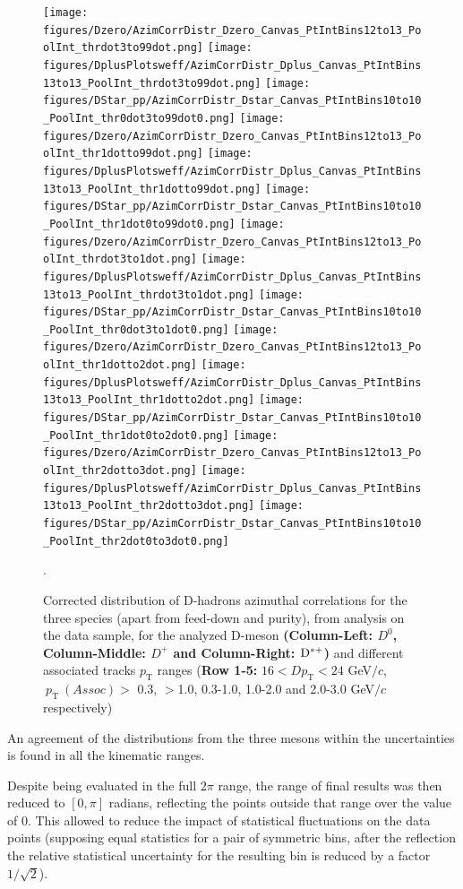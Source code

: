 \begin{figure}[hp]
\centering
{\texttt{[image: figures/Dzero/AzimCorrDistr\_Dzero\_Canvas\_PtIntBins12to13\_PoolInt\_thrdot3to99dot.png]}}
{\texttt{[image: figures/DplusPlotsweff/AzimCorrDistr\_Dplus\_Canvas\_PtIntBins13to13\_PoolInt\_thrdot3to99dot.png]}}
{\texttt{[image: figures/DStar\_pp/AzimCorrDistr\_Dstar\_Canvas\_PtIntBins10to10\_PoolInt\_thr0dot3to99dot0.png]}}
{\texttt{[image: figures/Dzero/AzimCorrDistr\_Dzero\_Canvas\_PtIntBins12to13\_PoolInt\_thr1dotto99dot.png]}}
{\texttt{[image: figures/DplusPlotsweff/AzimCorrDistr\_Dplus\_Canvas\_PtIntBins13to13\_PoolInt\_thr1dotto99dot.png]}}
{\texttt{[image: figures/DStar\_pp/AzimCorrDistr\_Dstar\_Canvas\_PtIntBins10to10\_PoolInt\_thr1dot0to99dot0.png]}}
{\texttt{[image: figures/Dzero/AzimCorrDistr\_Dzero\_Canvas\_PtIntBins12to13\_PoolInt\_thrdot3to1dot.png]}}
{\texttt{[image: figures/DplusPlotsweff/AzimCorrDistr\_Dplus\_Canvas\_PtIntBins13to13\_PoolInt\_thrdot3to1dot.png]}}
{\texttt{[image: figures/DStar\_pp/AzimCorrDistr\_Dstar\_Canvas\_PtIntBins10to10\_PoolInt\_thr0dot3to1dot0.png]}}
{\texttt{[image: figures/Dzero/AzimCorrDistr\_Dzero\_Canvas\_PtIntBins12to13\_PoolInt\_thr1dotto2dot.png]}}
{\texttt{[image: figures/DplusPlotsweff/AzimCorrDistr\_Dplus\_Canvas\_PtIntBins13to13\_PoolInt\_thr1dotto2dot.png]}}
{\texttt{[image: figures/DStar\_pp/AzimCorrDistr\_Dstar\_Canvas\_PtIntBins10to10\_PoolInt\_thr1dot0to2dot0.png]}}
{\texttt{[image: figures/Dzero/AzimCorrDistr\_Dzero\_Canvas\_PtIntBins12to13\_PoolInt\_thr2dotto3dot.png]}}
{\texttt{[image: figures/DplusPlotsweff/AzimCorrDistr\_Dplus\_Canvas\_PtIntBins13to13\_PoolInt\_thr2dotto3dot.png]}}
{\texttt{[image: figures/DStar\_pp/AzimCorrDistr\_Dstar\_Canvas\_PtIntBins10to10\_PoolInt\_thr2dot0to3dot0.png]}}
\caption{Corrected distribution of D-hadrons azimuthal correlations for the three species (apart from feed-down and purity), from analysis on the data sample, for the analyzed D-meson \textbf{(Column-Left: $D^0$, Column-Middle: $D^+$ and Column-Right: ${\rm D^{*+}}$)} and different associated tracks $p_\text{T}$ ranges (\textbf{Row 1-5:} $16 < D p_\text{T} < 24$ GeV$/c$, $ \ p_\text{T}~(Assoc)>$ 0.3, $>$1.0, 0.3-1.0, 1.0-2.0 and 2.0-3.0 GeV$/c$ respectively) }.
\label{fig:DataD0DpDs4}
\end{figure}
\clearpage
\newpage

An agreement of the distributions from the three mesons within the uncertainties is found in all the kinematic ranges.

Despite being evaluated in the full $2\pi$ range, the range of final results was then reduced to $[0,\pi]$ radians, reflecting the points outside that range over the value of 0. This allowed to reduce the impact of statistical fluctuations on the data points (supposing equal statistics for a pair of symmetric bins, after the reflection the relative statistical uncertainty for the resulting bin is reduced by a factor $1/\sqrt{2}$).

